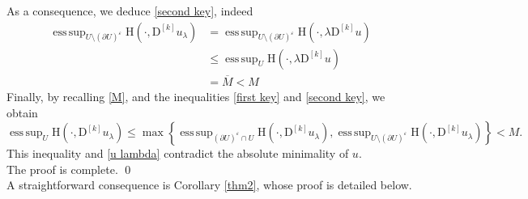 \documentclass[a4paper,11pt]{article}
\numberwithin{equation}{section}
\newcommand{\eps}{\varepsilon}
\newcommand{\rom}{\mathrm}
\DeclareMathOperator*{\esssup}{ess\,sup}
\theoremstyle{definition}
\begin{document}
As a consequence, we deduce \eqref{second key}, indeed
\begin{align*}
\esssup_{U\setminus (\partial U)^\eps}\rom{H}(\cdot, \mathrm D^{[k]}u_\lambda)&=\esssup_{U\setminus (\partial U)^\eps}\rom{H}(\cdot, \lambda\mathrm D^{[k]}u)\\
&\leq \esssup_{U}\rom{H}(\cdot, \lambda\mathrm D^{[k]}u)\\
&=\overline M<M
\end{align*}
Finally, by recalling \eqref{M}, and the inequalities \eqref{first key} and \eqref{second key}, we obtain
$$
\esssup_{U}\rom{H}(\cdot, \mathrm D^{[k]}u_\lambda)\leq \max\left\{\esssup_{(\partial U)^\eps\cap U}\rom{H}(\cdot, \mathrm D^{[k]}u_\lambda), \esssup_{U\setminus (\partial U)^\eps}\rom{H}(\cdot, \mathrm D^{[k]}u_\lambda)\right\}<M.
$$
This inequality and \eqref{u lambda} contradict the absolute minimality of $u$.\\
The proof is complete.
 \qed
\\

A straightforward consequence is Corollary \ref{thm2}, whose proof is detailed below.\\
\end{document}
